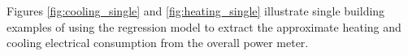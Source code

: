 Figures \ref{fig:cooling_single} and \ref{fig:heating_single} illustrate single building examples of using the regression model to extract the approximate heating and cooling electrical consumption from the overall power meter.